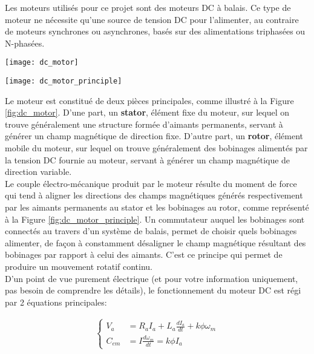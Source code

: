 Les moteurs utilisés pour ce projet sont des moteurs DC à balais. Ce type de moteur ne nécessite qu'une source de tension DC pour l'alimenter, au contraire de moteurs synchrones ou asynchrones, basés sur des alimentations triphasées ou N-phasées.\\

\begin{minipage}[t]{.45\textwidth}
	\centering
	\texttt{[image: dc\_motor]}
	\label{fig:dc_motor}
\end{minipage}
\hfill
\begin{minipage}[t]{.45\textwidth}
	\centering
	\texttt{[image: dc\_motor\_principle]}
	\label{fig:dc_motor_principle}
\end{minipage}
\vspace{.25cm}

Le moteur est constitué de deux pièces principales, comme illustré à la Figure \ref{fig:dc_motor}. D'une part, un \textbf{stator}, élément fixe du moteur, sur lequel on trouve généralement une structure formée d'aimants permanents, servant à générer un champ magnétique de direction fixe. D'autre part, un \textbf{rotor}, élément mobile du moteur, sur lequel on trouve généralement des bobinages alimentés par la tension DC fournie au moteur, servant à générer un champ magnétique de direction variable.\\

Le couple électro-mécanique produit par le moteur résulte du moment de force qui tend à aligner les directions des champs magnétiques générés respectivement par les aimants permanents au stator et les bobinages au rotor, comme représenté à la Figure \ref{fig:dc_motor_principle}. Un commutateur auquel les bobinages sont connectés au travers d'un système de balais, permet de choisir quels bobinages alimenter, de façon à constamment désaligner le champ magnétique résultant des bobinages par rapport à celui des aimants. C'est ce principe qui permet de produire un mouvement rotatif continu.\\

D'un point de vue purement électrique (et pour votre information uniquement, pas besoin de comprendre les détails), le fonctionnement du moteur DC est régi par 2 équations principales:

\begin{align*}
	\left \lbrace
	\begin{aligned}
		V_a &= R_a I_a + L_a \frac{dI_a}{dt} + k \phi \omega_m\\
		C_{em} &= I \frac{d\omega_m}{dt} = k \phi I_a
	\end{aligned}
	\right. 
\end{align*}

